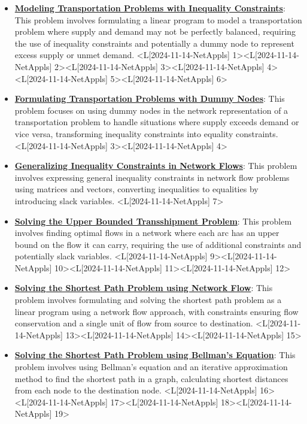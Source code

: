 \documentclass{article}%
\begin{document}
\begin{itemize}[[leftmargin=*]]%
\item \href{https://www.math.purdue.edu/~yipn/421/2024-11-14-NetAppls.pdf#page=1}{\textbf{Modeling Transportation Problems with Inequality Constraints}}: This problem involves formulating a linear program to model a transportation problem where supply and demand may not be perfectly balanced, requiring the use of inequality constraints and potentially a dummy node to represent excess supply or unmet demand. <L[2024-11-14-NetAppls] 1><L[2024-11-14-NetAppls] 2><L[2024-11-14-NetAppls] 3><L[2024-11-14-NetAppls] 4><L[2024-11-14-NetAppls] 5><L[2024-11-14-NetAppls] 6>%
\item \href{https://www.math.purdue.edu/~yipn/421/2024-11-14-NetAppls.pdf#page=3}{\textbf{Formulating Transportation Problems with Dummy Nodes}}: This problem focuses on using dummy nodes in the network representation of a transportation problem to handle situations where supply exceeds demand or vice versa, transforming inequality constraints into equality constraints. <L[2024-11-14-NetAppls] 3><L[2024-11-14-NetAppls] 4>%
\item \href{https://www.math.purdue.edu/~yipn/421/2024-11-14-NetAppls.pdf#page=7}{\textbf{Generalizing Inequality Constraints in Network Flows}}: This problem involves expressing general inequality constraints in network flow problems using matrices and vectors, converting inequalities to equalities by introducing slack variables. <L[2024-11-14-NetAppls] 7>%
\item \href{https://www.math.purdue.edu/~yipn/421/2024-11-14-NetAppls.pdf#page=9}{\textbf{Solving the Upper Bounded Transshipment Problem}}: This problem involves finding optimal flows in a network where each arc has an upper bound on the flow it can carry, requiring the use of additional constraints and potentially slack variables. <L[2024-11-14-NetAppls] 9><L[2024-11-14-NetAppls] 10><L[2024-11-14-NetAppls] 11><L[2024-11-14-NetAppls] 12>%
\item \href{https://www.math.purdue.edu/~yipn/421/2024-11-14-NetAppls.pdf#page=13}{\textbf{Solving the Shortest Path Problem using Network Flow}}: This problem involves formulating and solving the shortest path problem as a linear program using a network flow approach, with constraints ensuring flow conservation and a single unit of flow from source to destination. <L[2024-11-14-NetAppls] 13><L[2024-11-14-NetAppls] 14><L[2024-11-14-NetAppls] 15>%
\item \href{https://www.math.purdue.edu/~yipn/421/2024-11-14-NetAppls.pdf#page=16}{\textbf{Solving the Shortest Path Problem using Bellman's Equation}}: This problem involves using Bellman's equation and an iterative approximation method to find the shortest path in a graph, calculating shortest distances from each node to the destination node. <L[2024-11-14-NetAppls] 16><L[2024-11-14-NetAppls] 17><L[2024-11-14-NetAppls] 18><L[2024-11-14-NetAppls] 19>%

\end{itemize}
\end{document}
